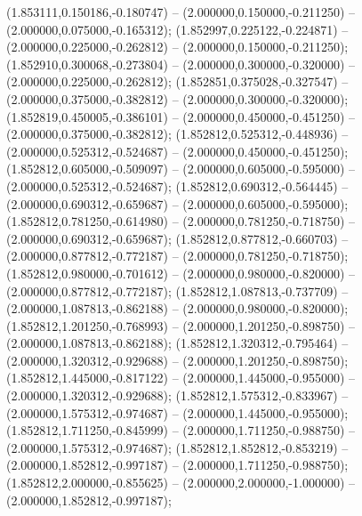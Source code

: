  (1.853111,0.150186,-0.180747) -- (2.000000,0.150000,-0.211250) -- (2.000000,0.075000,-0.165312);
 (1.852997,0.225122,-0.224871) -- (2.000000,0.225000,-0.262812) -- (2.000000,0.150000,-0.211250);
 (1.852910,0.300068,-0.273804) -- (2.000000,0.300000,-0.320000) -- (2.000000,0.225000,-0.262812);
 (1.852851,0.375028,-0.327547) -- (2.000000,0.375000,-0.382812) -- (2.000000,0.300000,-0.320000);
 (1.852819,0.450005,-0.386101) -- (2.000000,0.450000,-0.451250) -- (2.000000,0.375000,-0.382812);
 (1.852812,0.525312,-0.448936) -- (2.000000,0.525312,-0.524687) -- (2.000000,0.450000,-0.451250);
 (1.852812,0.605000,-0.509097) -- (2.000000,0.605000,-0.595000) -- (2.000000,0.525312,-0.524687);
 (1.852812,0.690312,-0.564445) -- (2.000000,0.690312,-0.659687) -- (2.000000,0.605000,-0.595000);
 (1.852812,0.781250,-0.614980) -- (2.000000,0.781250,-0.718750) -- (2.000000,0.690312,-0.659687);
 (1.852812,0.877812,-0.660703) -- (2.000000,0.877812,-0.772187) -- (2.000000,0.781250,-0.718750);
 (1.852812,0.980000,-0.701612) -- (2.000000,0.980000,-0.820000) -- (2.000000,0.877812,-0.772187);
 (1.852812,1.087813,-0.737709) -- (2.000000,1.087813,-0.862188) -- (2.000000,0.980000,-0.820000);
 (1.852812,1.201250,-0.768993) -- (2.000000,1.201250,-0.898750) -- (2.000000,1.087813,-0.862188);
 (1.852812,1.320312,-0.795464) -- (2.000000,1.320312,-0.929688) -- (2.000000,1.201250,-0.898750);
 (1.852812,1.445000,-0.817122) -- (2.000000,1.445000,-0.955000) -- (2.000000,1.320312,-0.929688);
 (1.852812,1.575312,-0.833967) -- (2.000000,1.575312,-0.974687) -- (2.000000,1.445000,-0.955000);
 (1.852812,1.711250,-0.845999) -- (2.000000,1.711250,-0.988750) -- (2.000000,1.575312,-0.974687);
 (1.852812,1.852812,-0.853219) -- (2.000000,1.852812,-0.997187) -- (2.000000,1.711250,-0.988750);
 (1.852812,2.000000,-0.855625) -- (2.000000,2.000000,-1.000000) -- (2.000000,1.852812,-0.997187);
